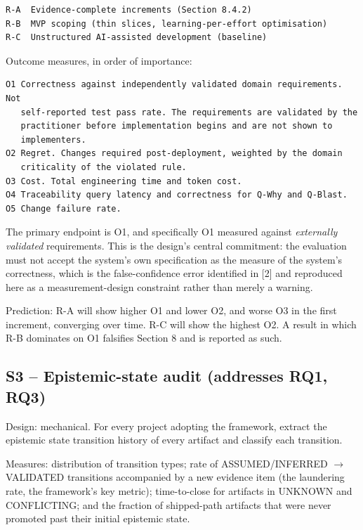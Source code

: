\documentclass[11pt,a4paper]{article}
\begin{document}
\begin{Verbatim}[fontsize=\footnotesize,breaklines=true,breakanywhere=true,breakautoindent=false,samepage=false]
R-A  Evidence-complete increments (Section 8.4.2)
R-B  MVP scoping (thin slices, learning-per-effort optimisation)
R-C  Unstructured AI-assisted development (baseline)
\end{Verbatim}

Outcome measures, in order of importance:

\begin{Verbatim}[fontsize=\footnotesize,breaklines=true,breakanywhere=true,breakautoindent=false,samepage=false]
O1 Correctness against independently validated domain requirements. Not
   self-reported test pass rate. The requirements are validated by the
   practitioner before implementation begins and are not shown to
   implementers.
O2 Regret. Changes required post-deployment, weighted by the domain
   criticality of the violated rule.
O3 Cost. Total engineering time and token cost.
O4 Traceability query latency and correctness for Q-Why and Q-Blast.
O5 Change failure rate.
\end{Verbatim}

The primary endpoint is O1, and specifically O1 measured against \emph{externally validated} requirements. This is the design's central commitment: the evaluation must not accept the system's own specification as the measure of the system's correctness, which is the false-confidence error identified in [2] and reproduced here as a measurement-design constraint rather than merely a warning.

Prediction: R-A will show higher O1 and lower O2, and worse O3 in the first increment, converging over time. R-C will show the highest O2. A result in which R-B dominates on O1 falsifies Section 8 and is reported as such.

\subsection{S3 -- Epistemic-state audit (addresses RQ1, RQ3)}

Design: mechanical. For every project adopting the framework, extract the epistemic state transition history of every artifact and classify each transition.

Measures: distribution of transition types; rate of ASSUMED/INFERRED $\rightarrow$ VALIDATED transitions accompanied by a new evidence item (the laundering rate, the framework's key metric); time-to-close for artifacts in UNKNOWN and CONFLICTING; and the fraction of shipped-path artifacts that were never promoted past their initial epistemic state.
\end{document}
